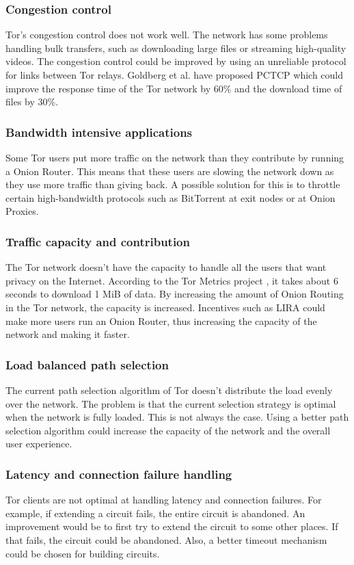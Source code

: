 \documentclass{article}
\begin{document}
		\subsubsection{Congestion control}
			Tor's congestion control does not work well. The network has some problems handling bulk transfers, such as downloading large files or streaming high-quality videos. The congestion control could be improved by using an unreliable protocol for links between Tor relays. Goldberg et al. \cite{alsabah2013pctcp} have proposed PCTCP which could improve the response time of the Tor network by 60\% and the download time of files by 30\%.	
		
		\subsubsection{Bandwidth intensive applications}
			Some Tor users put more traffic on the network than they contribute by running a Onion Router. This means that these users are slowing the network down as they use more traffic than giving back. A possible solution for this is to throttle certain high-bandwidth protocols such as BitTorrent at exit nodes or at Onion Proxies.
		
		\subsubsection{Traffic capacity and contribution}
			The Tor network doesn't have the capacity to handle all the users that want privacy on the Internet. According to the Tor Metrics project \cite{tormetricsprojectwebsite}, it takes about 6 seconds to download 1 MiB of data. By increasing the amount of Onion Routing in the Tor network, the capacity is increased. Incentives such as LIRA \cite{jansen13lira} could make more users run an Onion Router, thus increasing the capacity of the network and making it faster.	
		
		\subsubsection{Load balanced path selection}
			The current path selection algorithm of Tor doesn't distribute the load evenly over the network. The problem is that the current selection strategy is optimal when the network is fully loaded. This is not always the case. Using a better path selection algorithm could increase the capacity of the network and the overall user experience.		
		
		\subsubsection{Latency and connection failure handling}
			Tor clients are not optimal at handling latency and connection failures. For example, if extending a circuit fails, the entire circuit is abandoned. An improvement would be to first try to extend the circuit to some other places. If that fails, the circuit could be abandoned. Also, a better timeout mechanism could be chosen for building circuits.		
		
\end{document}
